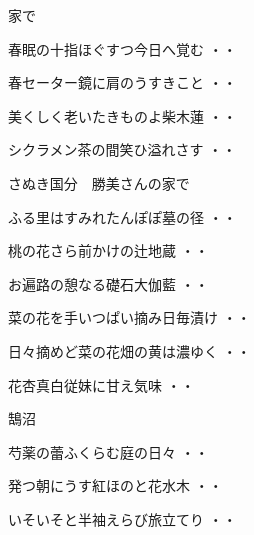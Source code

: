 \vspace{0.6cm}
家で
\begin{shiika}春眠の十指ほぐすつ今日へ覚む
\hfill{・・}\end{shiika}
\vspace{0.6cm}
\begin{shiika}春セーター鏡に肩のうすきこと
\hfill{・・}\end{shiika}
\vspace{0.6cm}
\begin{shiika}美くしく老いたきものよ柴木蓮
\hfill{・・}\end{shiika}
\vspace{0.6cm}
\begin{shiika}シクラメン茶の間笑ひ溢れさす
\hfill{・・}\end{shiika}
\vspace{0.6cm}
さぬき国分　勝美さんの家で
\begin{shiika}ふる里はすみれたんぽぽ墓の径
\hfill{・・}\end{shiika}
\begin{shiika}桃の花さら前かけの辻地蔵
\hfill{・・}\end{shiika}
\begin{shiika}お遍路の憩なる礎石大伽藍
\hfill{・・}\end{shiika}
\begin{shiika}菜の花を手いつぱい摘み日毎漬け
\hfill{・・}\end{shiika}
\begin{shiika}日々摘めど菜の花畑の黄は濃ゆく
\hfill{・・}\end{shiika}
\begin{shiika}花杏真白従妹に甘え気味
\hfill{・・}\end{shiika}
\vspace{0.6cm}
鵠沼
\begin{shiika}芍薬の蕾ふくらむ庭の日々
\hfill{・・}\end{shiika}
\begin{shiika}発つ朝にうす紅ほのと花水木
\hfill{・・}\end{shiika}
\begin{shiika}いそいそと半袖えらび旅立てり
\hfill{・・}\end{shiika}
